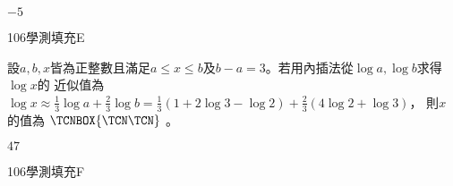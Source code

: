 \begin{QUESTIONS}
\begin{QUESTION}
        \begin{QFROMS}
        \end{QFROMS}
        \begin{QTAGS}\end{QTAGS}
        \begin{QANS}
            $-5$
        \end{QANS}
        \begin{QSOLLIST}
        \end{QSOLLIST}
        \begin{QEMPTYSPACE}
        \end{QEMPTYSPACE}
    \end{QUESTION}
    \begin{QUESTION}
        \begin{ExamInfo}{106}{學測}{填充}{E}
        \end{ExamInfo}
        \begin{ExamAnsRateInfo}{24}{59}{12}{1}
        \end{ExamAnsRateInfo}
        \begin{QBODY}
            設$a,b,x$皆為正整數且滿足$a\le x\le b$及$b-a=3$。若用內插法從$\log a,\log b$求得$\log x$的
			近似值為
			$\log x\approx {}\log a+\log b=(1+2-)+(4+)$，
			則$x$的值為 $\TCNBOX{\TCN\TCN}$        。
        \end{QBODY}
        \begin{QFROMS}
        \end{QFROMS}
        \begin{QTAGS}\end{QTAGS}
        \begin{QANS}
            $47$
        \end{QANS}
        \begin{QSOLLIST}
        \end{QSOLLIST}
        \begin{QEMPTYSPACE}
        \end{QEMPTYSPACE}
    \end{QUESTION}
    \begin{QUESTION}
        \begin{ExamInfo}{106}{學測}{填充}{F}
        \end{ExamInfo}

\end{QUESTION}
\end{QUESTIONS}
